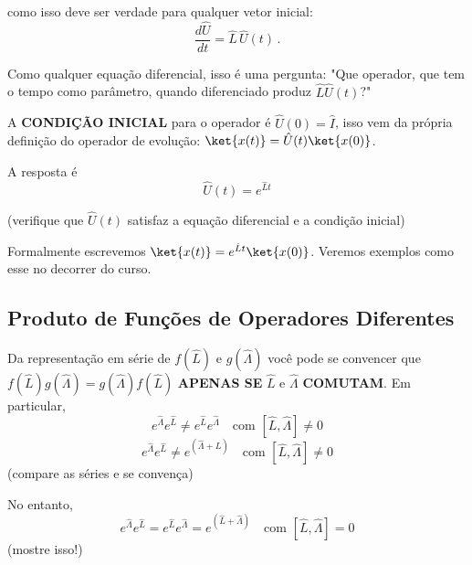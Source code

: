 como isso deve ser verdade para qualquer vetor inicial:
\begin{equation}
    \frac{d\hat{U}}{dt} = \hat{L}\,\hat{U}(t) \, .
\end{equation}

Como qualquer equação diferencial, isso é uma pergunta: "Que operador, que tem o tempo como parâmetro, quando diferenciado produz $\hat{L}\hat{U}(t)$?"

A \textbf{CONDIÇÃO INICIAL} para o operador é $\hat{U}(0) = \hat{I}$, isso vem da própria definição do operador de evolução: $\ket{x(t)} = \hat{U}(t)\ket{x(0)}$.

A resposta é
\begin{equation}
    \boxed{\hat{U}(t) = e^{\hat{L}t}}
\end{equation}

(verifique que $\hat{U}(t)$ satisfaz a equação diferencial e a condição inicial)

Formalmente escrevemos $\ket{x(t)} = e^{\hat{L}t}\ket{x(0)}$. Veremos exemplos como esse no decorrer do curso.

\subsection*{Produto de Funções de Operadores Diferentes}

Da representação em série de $f(\hat{L})$ e $g(\hat{\Lambda})$ você pode se convencer que $f(\hat{L})g(\hat{\Lambda}) = g(\hat{\Lambda})f(\hat{L})$ \textbf{APENAS SE} $\hat{L}$ e $\hat{\Lambda}$ \textbf{COMUTAM}. Em particular,
\begin{equation}
    e^{\hat{\Lambda}} e^{\hat{L}} \neq e^{\hat{L}} e^{\hat{\Lambda}} \quad \text{com } [\hat{L}, \hat{\Lambda}] \neq 0
\end{equation}
\begin{equation}
    e^{\hat{\Lambda}} e^{\hat{L}} \neq e^{(\hat{\Lambda}+\hat{L})} \quad \text{com } [\hat{L}, \hat{\Lambda}] \neq 0
\end{equation}
(compare as séries e se convença)

No entanto,
\begin{equation}
    \label{eq:aula6_exp_comutam}
    e^{\hat{\Lambda}} e^{\hat{L}} = e^{\hat{L}} e^{\hat{\Lambda}} = e^{(\hat{L}+\hat{\Lambda})} \quad \text{com } [\hat{L}, \hat{\Lambda}] = 0
\end{equation}
(mostre isso!)


